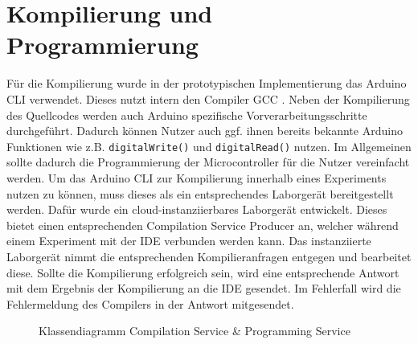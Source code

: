 \section{Kompilierung und Programmierung}\label{section:prototypische-implementierung:kompilierung-und-programmierung}

Für die Kompilierung wurde in der prototypischen Implementierung das \ac{Arduino CLI} \cite{noauthor_arduino-cli_nodate} verwendet. Dieses nutzt intern den Compiler \ac{GCC} \cite{noauthor_gcc_nodate}. Neben der Kompilierung des Quellcodes werden auch Arduino spezifische Vorverarbeitungsschritte durchgeführt. Dadurch können Nutzer auch ggf. ihnen bereits bekannte Arduino Funktionen wie z.B. \texttt{digitalWrite()} und \texttt{digitalRead()} nutzen. Im Allgemeinen sollte dadurch die Programmierung der Microcontroller für die Nutzer vereinfacht werden. Um das \ac{Arduino CLI} zur Kompilierung innerhalb eines Experiments nutzen zu können, muss dieses als ein entsprechendes Laborgerät bereitgestellt werden. Dafür wurde ein cloud-instanziierbares Laborgerät entwickelt. Dieses bietet einen entsprechenden Compilation Service Producer an, welcher während einem Experiment mit der IDE verbunden werden kann. Das instanziierte Laborgerät nimmt die entsprechenden Kompilieranfragen entgegen und bearbeitet diese. Sollte die Kompilierung erfolgreich sein, wird eine entsprechende Antwort mit dem Ergebnis der Kompilierung an die IDE gesendet. Im Fehlerfall wird die Fehlermeldung des Compilers in der Antwort mitgesendet.

\begin{figure}[tbp]
    \centering
    \caption{Klassendiagramm Compilation Service \& Programming Service}
    \label{figure:klassendiagramm-compilation-service}
\end{figure}

